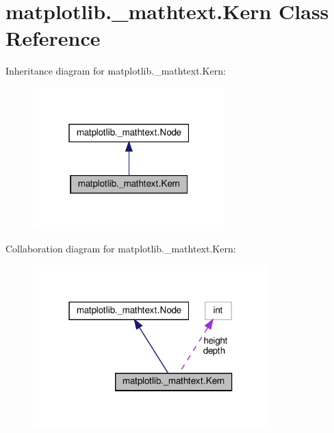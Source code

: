 \hypertarget{classmatplotlib_1_1__mathtext_1_1Kern}{}\section{matplotlib.\+\_\+mathtext.\+Kern Class Reference}
\label{classmatplotlib_1_1__mathtext_1_1Kern}


Inheritance diagram for matplotlib.\+\_\+mathtext.\+Kern\+:
\nopagebreak
\begin{figure}[H]
\begin{center}
\leavevmode
\includegraphics[width=211pt]{classmatplotlib_1_1__mathtext_1_1Kern__inherit__graph}
\end{center}
\end{figure}


Collaboration diagram for matplotlib.\+\_\+mathtext.\+Kern\+:
\nopagebreak
\begin{figure}[H]
\begin{center}
\leavevmode
\includegraphics[width=259pt]{classmatplotlib_1_1__mathtext_1_1Kern__coll__graph}
\end{center}
\end{figure}
